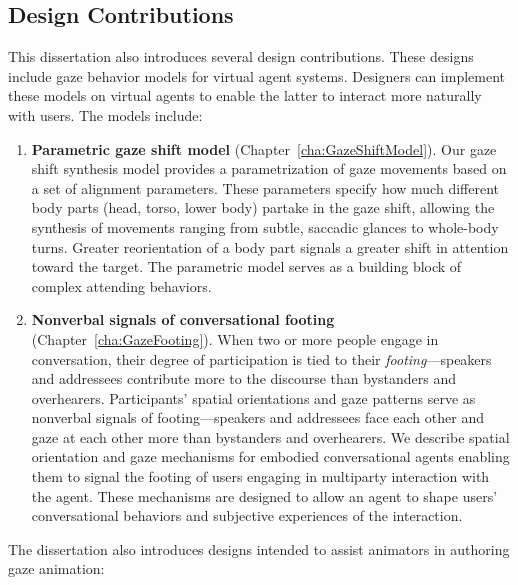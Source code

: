 \subsection{Design Contributions}

This dissertation also introduces several design contributions. These designs include gaze behavior models for virtual agent systems. Designers can implement these models on virtual agents to enable the latter to interact more naturally with users. The models include:

\begin{enumerate}
\item \textbf{Parametric gaze shift model} (Chapter~\ref{cha:GazeShiftModel}). Our gaze shift synthesis model provides a parametrization of gaze movements based on a set of alignment parameters. These parameters specify how much different body parts (head, torso, lower body) partake in the gaze shift, allowing the synthesis of movements ranging from subtle, saccadic glances to whole-body turns. Greater reorientation of a body part signals a greater shift in attention toward the target. The parametric model serves as a building block of complex attending behaviors.
\item \textbf{Nonverbal signals of conversational footing} (Chapter~\ref{cha:GazeFooting}). When two or more people engage in conversation, their degree of participation is tied to their \emph{footing}---speakers and addressees contribute more to the discourse than bystanders and overhearers. Participants' spatial orientations and gaze patterns serve as nonverbal signals of footing---speakers and addressees face each other and gaze at each other more than bystanders and overhearers. We describe spatial orientation and gaze mechanisms for embodied conversational agents enabling them to signal the footing of users engaging in multiparty interaction with the agent. These mechanisms are designed to allow an agent to shape users' conversational behaviors and subjective experiences of the interaction.
\end{enumerate}

The dissertation also introduces designs intended to assist animators in authoring gaze animation:


